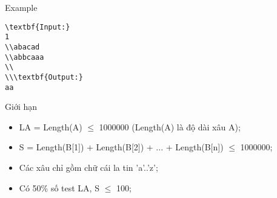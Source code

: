 Example  
\begin{verbatim}
\textbf{Input:}
1
\\abacad
\\abbcaaa
\\
\\\textbf{Output:}
aa\end{verbatim}
   Giới hạn  
\begin{itemize}
	\item     LA = Length(A)  $\le$  1000000 (Length(A) là độ dài xâu A);   
	\item     S = Length(B[1]) + Length(B[2]) + ... + Length(B[n])  $\le$  1000000;   
	\item     Các xâu chỉ gồm chữ cái la tin 'a'..'z';   
	\item     Có 50\% số test LA, S  $\le$  100;   
\end{itemize}